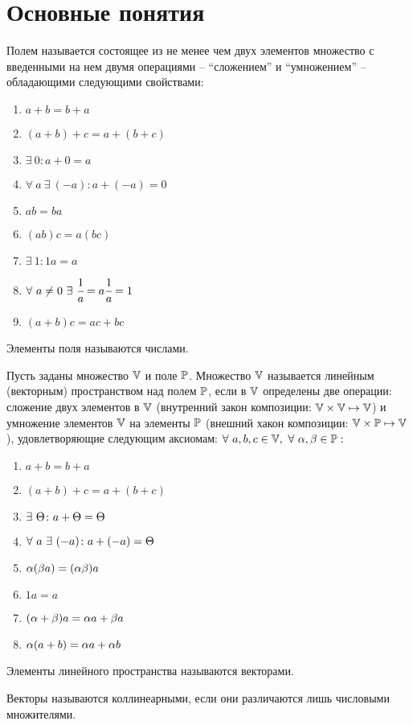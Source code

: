 \section{Основные понятия}
\begin{opred}
Полем называется состоящее из не менее чем двух элементов множество с введенными на нем двумя операциями -- ``сложением'' и ``умножением'' -- обладающими следующими свойствами:
\begin{enumerate}
\item $a+b=b+a$
\item $(a+b)+c=a+(b+c)$
\item $\exists\ 0\colon a+0=a$
\item $\forall\ a\ \exists\ (-a)\colon a+(-a)=0$
\item $ab=ba$
\item $(ab)c=a(bc)$
\item $\exists\ 1\colon 1a=a$
\item $\forall\ a\neq0\ \exists\ \cfrac1a=a\cfrac1a=1$
\item $(a+b)c=ac+bc$
\end{enumerate}
\end{opred}
\begin{remark}
Элементы поля называются числами.
\end{remark}
\begin{opred}
Пусть заданы множество $\V$ и поле $\P$. Множество $\V$ называется линейным (векторным) пространством над полем $\P$, если в $\V$ определены две операции: сложение двух элементов в $\V$ (внутренний закон композиции: $\V\times\V\mapsto\V$) и умножение элементов $\V$ на элементы $\P$ (внешний хакон композиции: $\V\times\P\mapsto\V$), удовлетворяющие следующим аксиомам: $\forall\ a,b,c\in\V,\ \forall\ \alpha,\beta\in\P:$
\begin{enumerate}
\item $a+b=b+a$
\item $(a+b)+c=a+(b+c)$
\item $\exists\ \T\colon a+\T=\T$
\item $\forall\ a\ \exists\ (-a)\colon a+(-a)=\T$
\item $\a(\b a)=(\a\b)a$
\item $1a=a$
\item $(\a+\b)a=\a a+\b a$
\item $\a(a+b)=\a a+\a b$
\end{enumerate}
Элементы линейного пространства называются векторами.
\end{opred}
\begin{opred}
Векторы называются коллинеарными, если они различаются лишь числовыми множителями.
\end{opred}
